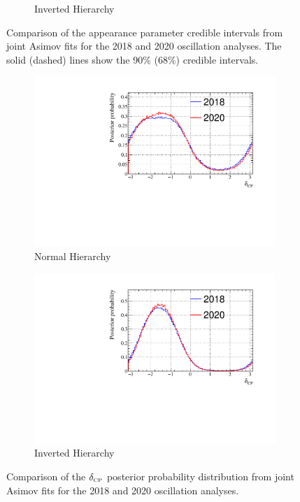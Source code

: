 \begin{figure}[!htbp]
\begin{subfigure}{.7\textwidth}
  \caption{Inverted Hierarchy}
  \label{fig:20182020AppIH}
\end{subfigure}
\caption{Comparison of the appearance parameter credible intervals from joint Asimov fits for the 2018 and 2020 oscillation analyses. The solid (dashed) lines show the 90$\%$ ($68\%$) credible intervals.}
\label{fig:20182020App}
\end{figure}

\begin{figure}[!htbp]
\centering
\begin{subfigure}{.7\textwidth}
  \centering
  \includegraphics[width=0.95\linewidth]{figs/compMaCh3Contours_20182020/compMaCh3Contours_20182020_woRC_dcp_data_NH}
  \caption{Normal Hierarchy}
  \label{fig:20182020dcpNH}
\end{subfigure}
\begin{subfigure}{.7\textwidth}
  \centering
  \includegraphics[width=0.95\linewidth]{figs/compMaCh3Contours_20182020/compMaCh3Contours_20182020_woRC_dcp_data_IH}
  \caption{Inverted Hierarchy}
  \label{fig:20182020dcpIH}
\end{subfigure}
\caption{Comparison of the $\delta_{\scriptscriptstyle\mathrm{CP}}$ posterior probability distribution from joint Asimov fits for the 2018 and 2020 oscillation analyses.}
\label{fig:20182020dcp}
\end{figure}

